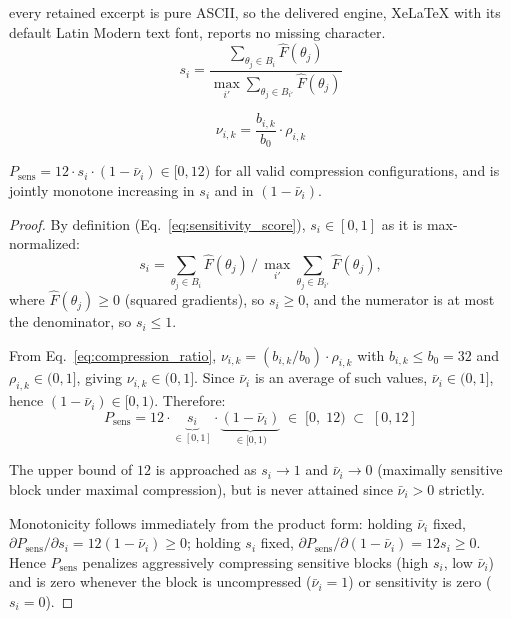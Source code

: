 \documentclass[10pt,a4paper]{amsart}
\begin{document}
every retained excerpt is pure ASCII, so the delivered engine, XeLaTeX with its default Latin Modern text font, reports no missing character.
\begin{equation}
    s_i = \frac{\displaystyle\sum_{\theta_j \in B_i} \hat{F}(\theta_j)}
               {\displaystyle\max_{i'} \sum_{\theta_j \in B_{i'}} \hat{F}(\theta_j)}
    \label{eq:sensitivity_score}
\end{equation}

\begin{equation}
    \nu_{i,k} = \frac{b_{i,k}}{b_0} \cdot \rho_{i,k}
    \label{eq:compression_ratio}
\end{equation}

\begin{proposition}
$P_{\mathrm{sens}} = 12 \cdot s_i \cdot (1 - \bar{\nu}_i) \in [0, 12)$ for all valid
compression configurations, and is jointly monotone increasing in $s_i$ and in
$(1-\bar{\nu}_i)$.
\end{proposition}

\begin{proof}
By definition (Eq.~\eqref{eq:sensitivity_score}), $s_i \in [0,1]$ as it is
max-normalized:\\ 
$$s_i = \sum_{\theta_j \in B_i}\hat{F}(\theta_j) \,/\,
\max_{i'}\sum_{\theta_j \in B_{i'}}\hat{F}(\theta_j),$$
 where $\hat{F}(\theta_j) \geq 0$
(squared gradients), so $s_i \geq 0$, and the numerator is at most the denominator,
so $s_i \leq 1$.

From Eq.~\eqref{eq:compression_ratio}, $\nu_{i,k} = (b_{i,k}/b_0)\cdot\rho_{i,k}$
with $b_{i,k} \leq b_0 = 32$ and $\rho_{i,k} \in (0,1]$, giving $\nu_{i,k} \in (0,1]$.
Since $\bar{\nu}_i$ is an average of such values, $\bar{\nu}_i \in (0,1]$, hence
$(1-\bar{\nu}_i) \in [0,1)$.
Therefore:
\begin{equation}
    P_{\mathrm{sens}} = 12 \cdot \underbrace{s_i}_{\in[0,1]} \cdot
    \underbrace{(1-\bar{\nu}_i)}_{\in[0,1)} \;\in\; [0,\;12)
    \;\subset\; [0,12]
\end{equation}

The upper bound of $12$ is approached as $s_i \to 1$ and $\bar{\nu}_i \to 0$
(maximally sensitive block under maximal compression), but is never attained since
$\bar{\nu}_i > 0$ strictly.

Monotonicity follows immediately from the product form: holding $\bar{\nu}_i$ fixed,
$\partial P_{\mathrm{sens}}/\partial s_i = 12(1-\bar{\nu}_i) \geq 0$; holding $s_i$
fixed, $\partial P_{\mathrm{sens}}/\partial(1-\bar{\nu}_i) = 12 s_i \geq 0$.
Hence $P_{\mathrm{sens}}$ penalizes aggressively compressing sensitive blocks
(high $s_i$, low $\bar{\nu}_i$) and is zero whenever the block is uncompressed
($\bar{\nu}_i = 1$) or sensitivity is zero ($s_i = 0$).
\end{proof}
\end{document}
